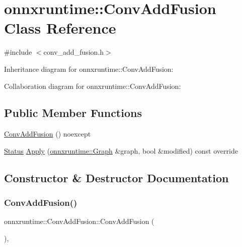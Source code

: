 \hypertarget{classonnxruntime_1_1ConvAddFusion}{}\section{onnxruntime\+:\+:Conv\+Add\+Fusion Class Reference}
\label{classonnxruntime_1_1ConvAddFusion}


{\ttfamily \#include $<$conv\+\_\+add\+\_\+fusion.\+h$>$}



Inheritance diagram for onnxruntime\+:\+:Conv\+Add\+Fusion\+:


Collaboration diagram for onnxruntime\+:\+:Conv\+Add\+Fusion\+:
\subsection*{Public Member Functions}
\begin{DoxyCompactItemize}
\item 
\mbox{\hyperlink{classonnxruntime_1_1ConvAddFusion_a03362739aa4ece1b288fd0cf2d31d8cd}{Conv\+Add\+Fusion}} () noexcept
\item 
\mbox{\hyperlink{classonnxruntime_1_1common_1_1Status}{Status}} \mbox{\hyperlink{classonnxruntime_1_1ConvAddFusion_aacc7121b10b0bb9744117b7b227fdcb3}{Apply}} (\mbox{\hyperlink{classonnxruntime_1_1Graph}{onnxruntime\+::\+Graph}} \&graph, bool \&modified) const override
\end{DoxyCompactItemize}


\subsection{Constructor \& Destructor Documentation}
\mbox{\label{classonnxruntime_1_1ConvAddFusion_a03362739aa4ece1b288fd0cf2d31d8cd}} 
\subsubsection{\texorpdfstring{Conv\+Add\+Fusion()}{ConvAddFusion()}}
{\footnotesize\ttfamily onnxruntime\+::\+Conv\+Add\+Fusion\+::\+Conv\+Add\+Fusion (\begin{DoxyParamCaption}{ }\end{DoxyParamCaption})\hspace{0.3cm}{\ttfamily [inline]}, {\ttfamily [noexcept]}}



